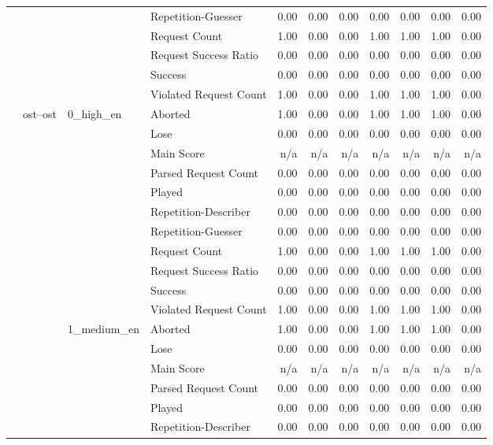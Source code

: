 \begin{tabular}{llllrrrrrrr}
 &  &  & Repetition-Guesser & 0.00 & 0.00 & 0.00 & 0.00 & 0.00 & 0.00 & 0.00 \\
 &  &  & Request Count & 1.00 & 0.00 & 0.00 & 1.00 & 1.00 & 1.00 & 0.00 \\
 &  &  & Request Success Ratio & 0.00 & 0.00 & 0.00 & 0.00 & 0.00 & 0.00 & 0.00 \\
 &  &  & Success & 0.00 & 0.00 & 0.00 & 0.00 & 0.00 & 0.00 & 0.00 \\
 &  &  & Violated Request Count & 1.00 & 0.00 & 0.00 & 1.00 & 1.00 & 1.00 & 0.00 \\
\cline{2-11} \cline{3-11}
 & \multirow[t]{33}{*}{ost--ost} & \multirow[t]{11}{*}{0_high_en} & Aborted & 1.00 & 0.00 & 0.00 & 1.00 & 1.00 & 1.00 & 0.00 \\
 &  &  & Lose & 0.00 & 0.00 & 0.00 & 0.00 & 0.00 & 0.00 & 0.00 \\
 &  &  & Main Score & n/a & n/a & n/a & n/a & n/a & n/a & n/a \\
 &  &  & Parsed Request Count & 0.00 & 0.00 & 0.00 & 0.00 & 0.00 & 0.00 & 0.00 \\
 &  &  & Played & 0.00 & 0.00 & 0.00 & 0.00 & 0.00 & 0.00 & 0.00 \\
 &  &  & Repetition-Describer & 0.00 & 0.00 & 0.00 & 0.00 & 0.00 & 0.00 & 0.00 \\
 &  &  & Repetition-Guesser & 0.00 & 0.00 & 0.00 & 0.00 & 0.00 & 0.00 & 0.00 \\
 &  &  & Request Count & 1.00 & 0.00 & 0.00 & 1.00 & 1.00 & 1.00 & 0.00 \\
 &  &  & Request Success Ratio & 0.00 & 0.00 & 0.00 & 0.00 & 0.00 & 0.00 & 0.00 \\
 &  &  & Success & 0.00 & 0.00 & 0.00 & 0.00 & 0.00 & 0.00 & 0.00 \\
 &  &  & Violated Request Count & 1.00 & 0.00 & 0.00 & 1.00 & 1.00 & 1.00 & 0.00 \\
\cline{3-11}
 &  & \multirow[t]{11}{*}{1_medium_en} & Aborted & 1.00 & 0.00 & 0.00 & 1.00 & 1.00 & 1.00 & 0.00 \\
 &  &  & Lose & 0.00 & 0.00 & 0.00 & 0.00 & 0.00 & 0.00 & 0.00 \\
 &  &  & Main Score & n/a & n/a & n/a & n/a & n/a & n/a & n/a \\
 &  &  & Parsed Request Count & 0.00 & 0.00 & 0.00 & 0.00 & 0.00 & 0.00 & 0.00 \\
 &  &  & Played & 0.00 & 0.00 & 0.00 & 0.00 & 0.00 & 0.00 & 0.00 \\
 &  &  & Repetition-Describer & 0.00 & 0.00 & 0.00 & 0.00 & 0.00 & 0.00 & 0.00 \\

\end{tabular}
